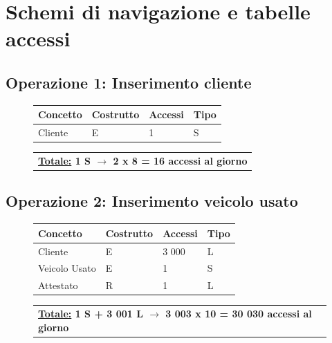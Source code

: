 \documentclass[a4paper,12pt]{report}
\begin{document}
\section{Schemi di navigazione e tabelle accessi}
\subsection*{Operazione 1: Inserimento cliente}
\begin{figure}[H]
	\centering
	\begin{tabular}{L{3cm}C{2cm}C{4.5cm}C{2cm}}
		\rule[-1.5mm]{0mm}{0.60cm}{}
		\textbf{Concetto} & \textbf{Costrutto} &\textbf{Accessi} & \textbf{Tipo} \\	
		\hline\rule[-2mm]{0mm}{0.65cm}{}
		Cliente & E & 1 & S \\
	\end{tabular}
	
	\begin{tabular}{C{12.9cm}}
		\rule[-3mm]{0mm}{0.85cm}{}	
		 \textbf{\underline{Totale:} 1 S $\to$ 2 x 8 = 16 accessi al giorno}
	\end{tabular}
\end{figure}

\subsection*{Operazione 2: Inserimento veicolo usato}
\begin{figure}[H]
	\centering
	\begin{tabular}{L{3cm}C{2cm}C{4.5cm}C{2cm}}
		\rule[-2mm]{0mm}{0.6cm}{}
		\textbf{Concetto} & \textbf{Costrutto} &\textbf{Accessi} & \textbf{Tipo} \\
		\hline\rule[-2mm]{0mm}{0.65cm}{}
		Cliente & E & 3 000 & L \\
		\hline\rule[-2mm]{0mm}{0.65cm}{}
		Veicolo Usato & E & 1 & S \\
		\hline\rule[-2mm]{0mm}{0.65cm}{}
		Attestato & R & 1 & L \\
	\end{tabular}
	
	\begin{tabular}{C{12.9cm}}
		\rule[-3mm]{0mm}{0.85cm}{}	
		 \textbf{\underline{Totale:} 1 S + 3 001 L $\to$ 3 003 x 10 = 30 030 accessi al giorno}
	\end{tabular}
\end{figure}
\end{document}
